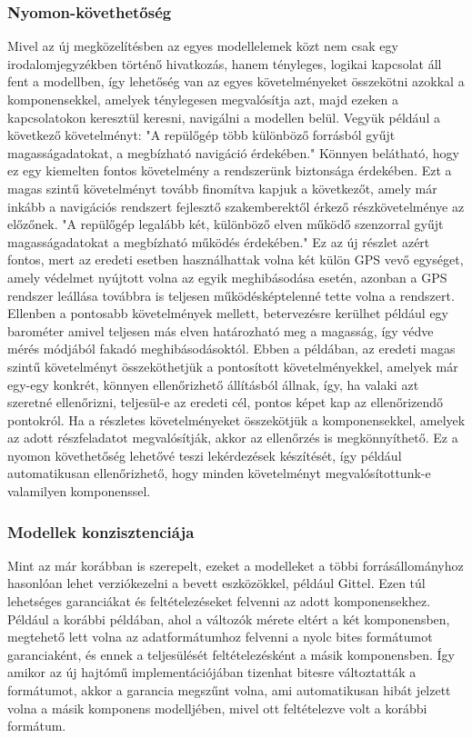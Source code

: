         \subsubsection{Nyomon-követhetőség}
        Mivel az új megközelítésben az egyes modellelemek közt nem csak egy irodalomjegyzékben történő hivatkozás, hanem tényleges, logikai kapcsolat áll fent a modellben, így lehetőség van az egyes követelményeket összekötni azokkal a komponensekkel, amelyek ténylegesen megvalósítja azt, majd ezeken a kapcsolatokon keresztül keresni, navigálni a modellen belül. Vegyük például a következő követelményt: "A repülőgép több különböző forrásból gyűjt magasságadatokat, a megbízható navigáció érdekében."
        Könnyen belátható, hogy ez egy kiemelten fontos követelmény a rendszerünk biztonsága érdekében. Ezt a magas szintű követelményt tovább finomítva kapjuk a következőt, amely már inkább a navigációs rendszert fejlesztő szakemberektől érkező részkövetelménye az előzőnek. "A repülőgép legalább két, különböző elven működő szenzorral gyűjt magasságadatokat a megbízható működés érdekében." Ez az új részlet azért fontos, mert az eredeti esetben használhattak volna két külön GPS vevő egységet, amely védelmet nyújtott volna az egyik meghibásodása esetén, azonban a GPS rendszer leállása továbbra is teljesen működésképtelenné tette volna a rendszert. Ellenben a pontosabb követelmények mellett, betervezésre kerülhet például egy barométer amivel teljesen más elven határozható meg a magasság, így védve mérés módjából fakadó meghibásodásoktól.
        Ebben a példában, az eredeti magas szintű követelményt összeköthetjük a pontosított követelményekkel, amelyek már egy-egy konkrét, könnyen ellenőrizhető állításból állnak, így, ha valaki azt szeretné ellenőrizni, teljesül-e az eredeti cél, pontos képet kap az ellenőrizendő pontokról. Ha a részletes követelményeket összekötjük a komponensekkel, amelyek az adott részfeladatot megvalósítják, akkor az ellenőrzés is megkönnyíthető.
        Ez a nyomon követhetőség lehetővé teszi lekérdezések készítését, így például automatikusan ellenőrizhető, hogy minden követelményt megvalósítottunk-e valamilyen komponenssel.

        \subsubsection{Modellek konzisztenciája}
        Mint az már korábban is szerepelt, ezeket a modelleket a többi forrásállományhoz hasonlóan lehet verziókezelni a bevett eszközökkel, például Gittel.
        Ezen túl lehetséges garanciákat és feltételezéseket felvenni az adott komponensekhez. Például a korábbi példában, ahol a változók mérete eltért a két komponensben, megtehető lett volna az adatformátumhoz felvenni a nyolc bites formátumot garanciaként, és ennek a teljesülését feltételezésként a másik komponensben.
        Így amikor az új hajtómű implementációjában tizenhat bitesre változtatták a formátumot, akkor a garancia megszűnt volna, ami automatikusan hibát jelzett volna a másik komponens modelljében, mivel ott feltételezve volt a korábbi formátum.

